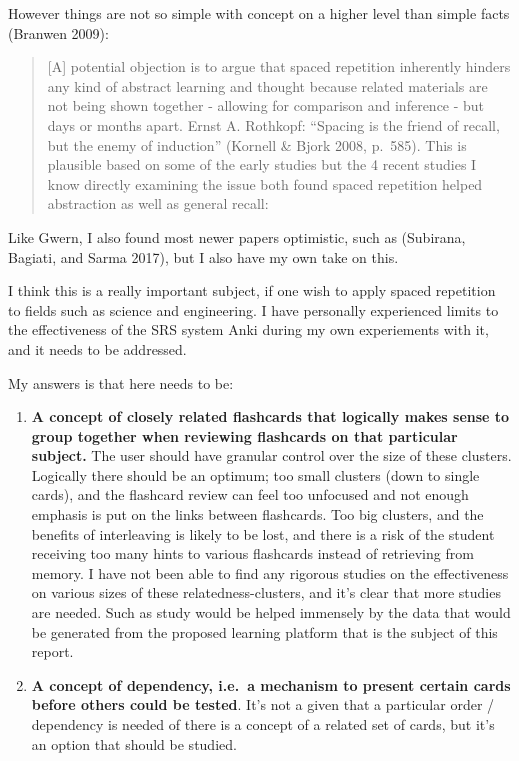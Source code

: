 However things are not so simple with concept on a higher level than
simple facts (Branwen 2009):

\begin{quote}
{[}A{]} potential objection is to argue that spaced repetition
inherently hinders any kind of abstract learning and thought because
related materials are not being shown together - allowing for comparison
and inference - but days or months apart. Ernst A. Rothkopf: ``Spacing
is the friend of recall, but the enemy of induction'' (Kornell \& Bjork
2008, p.~585). This is plausible based on some of the early studies but
the 4 recent studies I know directly examining the issue both found
spaced repetition helped abstraction as well as general recall:
\end{quote}

Like Gwern, I also found most newer papers optimistic, such as
(Subirana, Bagiati, and Sarma 2017), but I also have my own take on
this.

I think this is a really important subject, if one wish to apply spaced
repetition to fields such as science and engineering. I have personally
experienced limits to the effectiveness of the SRS system Anki during my
own experiements with it, and it needs to be addressed.

My answers is that here needs to be:

\begin{enumerate}
\def\labelenumi{\arabic{enumi}.}
\tightlist
\item
  \textbf{A concept of closely related flashcards that logically makes
  sense to group together when reviewing flashcards on that particular
  subject.} The user should have granular control over the size of these
  clusters. Logically there should be an optimum; too small clusters
  (down to single cards), and the flashcard review can feel too
  unfocused and not enough emphasis is put on the links between
  flashcards. Too big clusters, and the benefits of interleaving is
  likely to be lost, and there is a risk of the student receiving too
  many hints to various flashcards instead of retrieving from memory. I
  have not been able to find any rigorous studies on the effectiveness
  on various sizes of these relatedness-clusters, and it's clear that
  more studies are needed. Such as study would be helped immensely by
  the data that would be generated from the proposed learning platform
  that is the subject of this report.
\item
  \textbf{A concept of dependency, i.e.~a mechanism to present certain
  cards before others could be tested}. It's not a given that a
  particular order / dependency is needed of there is a concept of a
  related set of cards, but it's an option that should be studied.
\end{enumerate}

